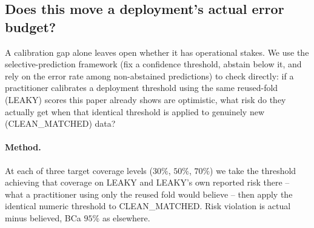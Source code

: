 \documentclass{article}
\begin{document}
\subsection{Does this move a deployment's actual error budget?}
\label{sec:selective-prediction}

A calibration gap alone leaves open whether it has operational stakes. We
use the selective-prediction framework (fix a confidence threshold, abstain
below it, and rely on the error rate among non-abstained predictions) to
check directly: if a practitioner calibrates a deployment threshold using
the same reused-fold (LEAKY) scores this paper already shows are optimistic,
what risk do they actually get when that identical threshold is applied to
genuinely new (CLEAN\_MATCHED) data?

\paragraph{Method.} At each of three target coverage levels ($30\%$, $50\%$,
$70\%$) we take the threshold achieving that coverage on LEAKY and LEAKY's own
reported risk there -- what a practitioner using only the reused fold would
believe -- then apply the identical numeric threshold to CLEAN\_MATCHED. Risk
violation is actual minus believed, BCa $95\%$ as elsewhere.
\end{document}
